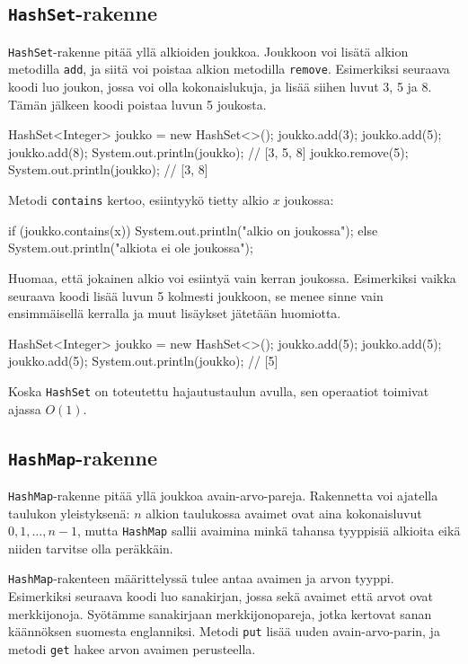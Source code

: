\subsection{\texttt{HashSet}-rakenne}

\texttt{HashSet}-rakenne pitää yllä alkioiden joukkoa.
Joukkoon voi lisätä alkion metodilla \texttt{add},
ja siitä voi poistaa alkion metodilla \texttt{remove}.
Esimerkiksi seuraava koodi luo joukon, jossa voi olla
kokonaislukuja, ja lisää siihen luvut 3, 5 ja 8.
Tämän jälkeen koodi poistaa luvun 5 joukosta.

\begin{code}
HashSet<Integer> joukko = new HashSet<>();
joukko.add(3);
joukko.add(5);
joukko.add(8);
System.out.println(joukko); // [3, 5, 8]
joukko.remove(5);
System.out.println(joukko); // [3, 8]
\end{code}

Metodi \texttt{contains} kertoo, esiintyykö tietty alkio $x$ joukossa:

\begin{code}
if (joukko.contains(x)) {
    System.out.println("alkio on joukossa");
} else {
    System.out.println("alkiota ei ole joukossa");
}
\end{code}

Huomaa, että jokainen alkio voi esiintyä vain kerran joukossa.
Esimerkiksi vaikka seuraava koodi lisää luvun 5 kolmesti
joukkoon, se menee sinne vain ensimmäisellä kerralla ja
muut lisäykset jätetään huomiotta.

\begin{code}
HashSet<Integer> joukko = new HashSet<>();
joukko.add(5);
joukko.add(5);
joukko.add(5);
System.out.println(joukko); // [5]
\end{code}

Koska \texttt{HashSet} on toteutettu hajautustaulun avulla,
sen operaatiot toimivat ajassa $O(1)$.

\subsection{\texttt{HashMap}-rakenne}

\texttt{HashMap}-rakenne pitää yllä joukkoa avain-arvo-pareja.
Rakennetta voi ajatella taulukon yleistyksenä:
$n$ alkion taulukossa avaimet ovat aina kokonaisluvut
$0,1,\ldots,n-1$, mutta \texttt{HashMap} sallii
avaimina minkä tahansa tyyppisiä alkioita eikä niiden
tarvitse olla peräkkäin.

\texttt{HashMap}-rakenteen määrittelyssä tulee antaa
avaimen ja arvon tyyppi.
Esimerkiksi seuraava koodi luo sanakirjan, jossa sekä
avaimet että arvot ovat merkkijonoja.
Syötämme sanakirjaan merkkijonopareja, jotka kertovat
sanan käännöksen suomesta englanniksi.
Metodi \texttt{put} lisää uuden avain-arvo-parin,
ja metodi \texttt{get} hakee arvon avaimen perusteella.

